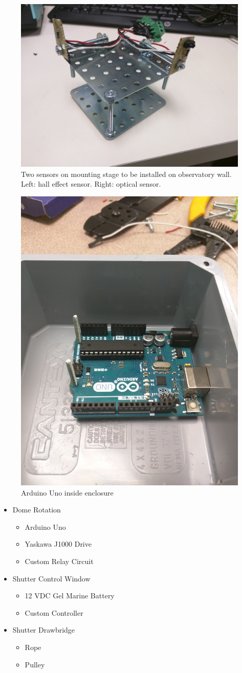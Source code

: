 \begin{figure}[h]
    \centering
    \includegraphics[width=0.5\columnwidth]{figures/prototype.jpg}
    \caption{Two sensors on mounting stage to be installed on observatory wall. Left: hall effect sensor. Right: optical sensor.}
\label{fig:sensors}
\end{figure}
\begin{figure}[h]
    \centering
    \includegraphics[width=0.5\columnwidth]{figures/arduino.jpg}
    \caption{Arduino Uno inside enclosure}
\label{fig:arduino}
\end{figure}
\begin{itemize}
    \item Dome Rotation
        \begin{itemize}
            \item Arduino Uno  
            \item Yaskawa J1000 Drive
            \item Custom Relay Circuit
        \end{itemize}
    \item Shutter Control Window
        \begin{itemize}
            \item 12 VDC Gel Marine Battery
            \item Custom Controller
        \end{itemize}
    \item Shutter Drawbridge
        \begin{itemize}
            \item Rope
            \item Pulley
        \end{itemize}
\end{itemize}
    
